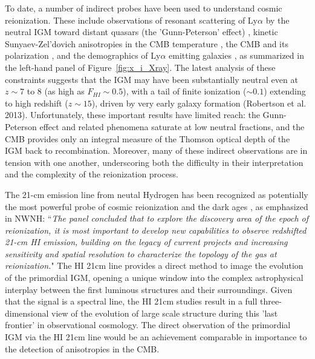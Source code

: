 \documentclass[preprint]{aastex}
\def\HI{{H{\small I }}}
\begin{document}
To date, a number of indirect probes have been used to understand
cosmic reionization. These include observations of resonant scattering
of Ly$\alpha$ by the neutral IGM toward distant quasars (the
'Gunn-Peterson' effect) \citep{fan_et_al2006}, kinetic
Sunyaev-Zel'dovich anisotropies in the CMB temperature
\citep{zahn_et_al2012_trunc}, the CMB \citep{planck_et_al2013} and its
polarization \citep{page_et_al2007}, and the demographics of
Ly$\alpha$ emitting galaxies \citep{treu_et_al2013}, as summarized in
the left-hand panel of Figure~\ref{fig:x_i_Xray}. The latest analysis
of these constraints suggests that the IGM may have been substantially
neutral even at $z \sim 7$ to 8 (as high as $F_{HI} \sim 0.5$), with
a tail of finite ionization ($\sim 0.1$) extending to high redshift
($z \sim 15$), driven by very early galaxy formation (Robertson et
al. 2013).  Unfortunately, these important results have limited
reach: the Gunn-Peterson effect and related phenomena saturate at low
neutral fractions, and the CMB provides only an integral measure of
the Thomson optical depth of the IGM back to recombination. Moreover,
many of these indirect observations are in tension with one another,
underscoring both the difficulty in their interpretation and the
complexity of the reionization process.

The 21-cm emission line from neutal Hydrogen has been recognized as
potentially the most powerful probe of cosmic reionization and 
the dark ages \citep{morales_wyithe2010,
furlanetto_et_al2006}, as emphasized in NWNH: ``{\it The panel
concluded that to explore the discovery area of the epoch of
reionization, it is most important to develop new capabilities to
observe redshifted 21-cm \HI emission, building on the legacy of
current projects and increasing sensitivity and spatial resolution to
characterize the topology of the gas at reionization.}"  The HI 21cm
line provides a direct method to image the evolution of the primordial
IGM, opening a unique window into the complex astrophysical
interplay between the first luminous structures and their
surroundings. Given that the signal is a spectral line, the HI 21cm
studies result in a full three-dimensional view of the evolution of
large scale structure during this 'last frontier' in observational
cosmology. The direct observation of the primordial IGM via
the HI 21cm line would be an achievement comparable in importance to
the detection of anisotropies in the CMB.
\end{document}
